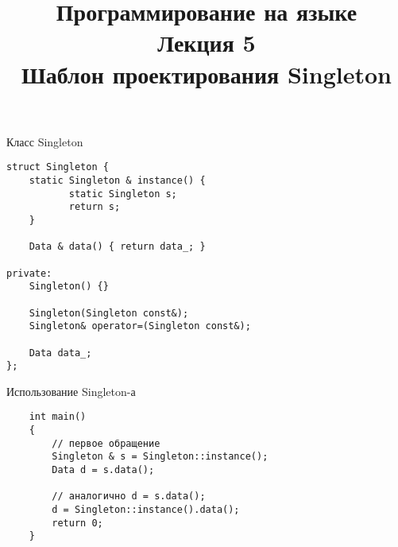 \documentclass{beamer}
\title{{\bf Программирование на языке \langcpp\protect\\Лекция
5\protect\vspace{1em}\\}Шаблон проектирования Singleton}
\begin{document}
\begin{frame} 
  \titlepage
\end{frame}

\begin{frame}[fragile]{Класс Singleton}
\begin{lstlisting}
struct Singleton {
    static Singleton & instance() {
           static Singleton s;
           return s;
    }

    Data & data() { return data_; }

private:
    Singleton() {}
    
    Singleton(Singleton const&);
    Singleton& operator=(Singleton const&);
    
    Data data_;
};
\end{lstlisting}
\end{frame}

\begin{frame}[fragile]{Использование Singleton-а}{}
\begin{lstlisting}
    int main()
    {
        // первое обращение
        Singleton & s = Singleton::instance();
        Data d = s.data();

        // аналогично d = s.data();
        d = Singleton::instance().data();
        return 0;    
    }

\end{lstlisting}
\end{frame}
\end{document}
